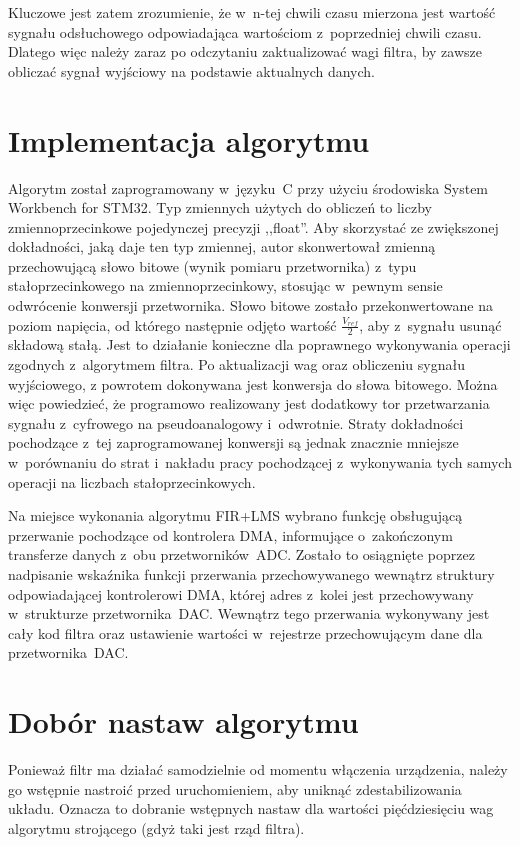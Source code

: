 Kluczowe jest zatem zrozumienie, że w~n-tej chwili czasu mierzona jest wartość sygnału odsłuchowego odpowiadająca wartościom z~poprzedniej chwili czasu. Dlatego więc należy zaraz po odczytaniu zaktualizować wagi filtra, by zawsze obliczać sygnał wyjściowy na podstawie aktualnych danych.
\section{Implementacja algorytmu}
Algorytm został zaprogramowany w~języku~C przy użyciu środowiska System Workbench for STM32. Typ zmiennych użytych do obliczeń to liczby zmiennoprzecinkowe pojedynczej precyzji ,,float''. Aby skorzystać ze zwiększonej dokładności, jaką daje ten typ zmiennej, autor skonwertował zmienną przechowującą słowo bitowe (wynik pomiaru przetwornika) z~typu stałoprzecinkowego na zmiennoprzecinkowy, stosując w~pewnym sensie odwrócenie konwersji przetwornika. Słowo bitowe zostało przekonwertowane na poziom napięcia, od którego następnie odjęto wartość $ \frac{V_{ref}}{2} $, aby z~sygnału usunąć składową stałą. Jest to działanie konieczne dla poprawnego wykonywania operacji zgodnych z~algorytmem filtra. Po aktualizacji wag oraz obliczeniu sygnału wyjściowego, z powrotem dokonywana jest konwersja do słowa bitowego. Można więc powiedzieć, że programowo realizowany jest dodatkowy tor przetwarzania sygnału z~cyfrowego na pseudoanalogowy i~odwrotnie. Straty dokładności pochodzące z~tej zaprogramowanej konwersji są jednak znacznie mniejsze w~porównaniu do strat i~nakładu pracy pochodzącej z~wykonywania tych samych operacji na liczbach stałoprzecinkowych.

Na miejsce wykonania algorytmu FIR+LMS wybrano funkcję obsługującą przerwanie pochodzące od kontrolera DMA, informujące o~zakończonym transferze danych z~obu przetworników~ADC. Zostało to osiągnięte poprzez nadpisanie wskaźnika funkcji przerwania przechowywanego wewnątrz struktury odpowiadającej kontrolerowi DMA, której adres z~kolei jest przechowywany w~strukturze przetwornika~DAC. Wewnątrz tego przerwania wykonywany jest cały kod filtra oraz ustawienie wartości w~rejestrze przechowującym dane dla przetwornika~DAC.
\section{Dobór nastaw algorytmu}
Ponieważ filtr ma działać samodzielnie od momentu włączenia urządzenia, należy go wstępnie nastroić przed uruchomieniem, aby uniknąć zdestabilizowania układu. Oznacza to dobranie wstępnych nastaw dla wartości pięćdziesięciu wag algorytmu strojącego (gdyż taki jest rząd filtra).
